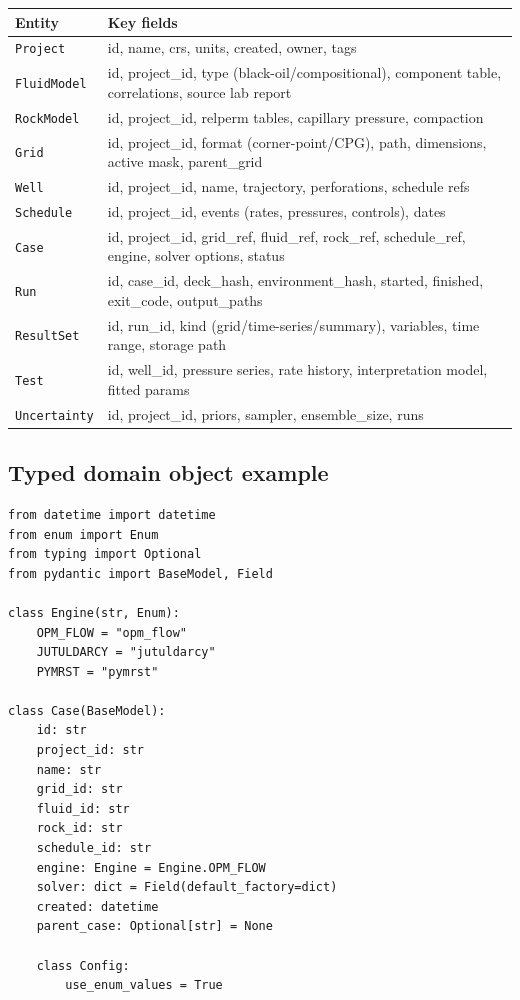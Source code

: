\documentclass[11pt,a4paper]{article}
\begin{document}
\begin{longtable}{@{}p{3.0cm}p{11.8cm}@{}}
\toprule
\textbf{Entity} & \textbf{Key fields}\\
\midrule
\endhead
\texttt{Project}   & id, name, crs, units, created, owner, tags\\
\texttt{FluidModel} & id, project\_id, type (black-oil/compositional), component table, correlations, source lab report\\
\texttt{RockModel}  & id, project\_id, relperm tables, capillary pressure, compaction\\
\texttt{Grid}       & id, project\_id, format (corner-point/CPG), path, dimensions, active mask, parent\_grid\\
\texttt{Well}       & id, project\_id, name, trajectory, perforations, schedule refs\\
\texttt{Schedule}   & id, project\_id, events (rates, pressures, controls), dates\\
\texttt{Case}       & id, project\_id, grid\_ref, fluid\_ref, rock\_ref, schedule\_ref, engine, solver options, status\\
\texttt{Run}        & id, case\_id, deck\_hash, environment\_hash, started, finished, exit\_code, output\_paths\\
\texttt{ResultSet}  & id, run\_id, kind (grid/time-series/summary), variables, time range, storage path\\
\texttt{Test}       & id, well\_id, pressure series, rate history, interpretation model, fitted params\\
\texttt{Uncertainty}& id, project\_id, priors, sampler, ensemble\_size, runs\\
\bottomrule
\end{longtable}

\subsection{Typed domain object example}

\begin{lstlisting}[caption={A pydantic model for a simulation case (excerpt).}]
from datetime import datetime
from enum import Enum
from typing import Optional
from pydantic import BaseModel, Field

class Engine(str, Enum):
    OPM_FLOW = "opm_flow"
    JUTULDARCY = "jutuldarcy"
    PYMRST = "pymrst"

class Case(BaseModel):
    id: str
    project_id: str
    name: str
    grid_id: str
    fluid_id: str
    rock_id: str
    schedule_id: str
    engine: Engine = Engine.OPM_FLOW
    solver: dict = Field(default_factory=dict)
    created: datetime
    parent_case: Optional[str] = None

    class Config:
        use_enum_values = True
\end{lstlisting}
\end{document}
